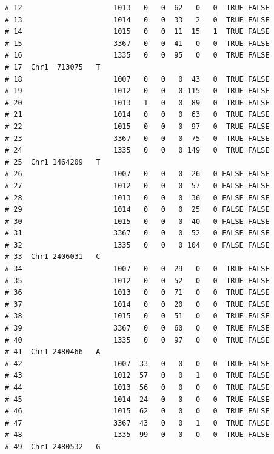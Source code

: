 \documentclass{article}\usepackage[]{graphicx}\usepackage[]{color}
\makeatletter
\newenvironment{kframe}{%
 \def\at@end@of@kframe{}%
 \ifinner\ifhmode%
  \def\at@end@of@kframe{\end{minipage}}%
  \begin{minipage}{\columnwidth}%
 \fi\fi%
 \def\FrameCommand##1{\hskip\@totalleftmargin \hskip-\fboxsep
 \colorbox{shadecolor}{##1}\hskip-\fboxsep
     \hskip-\linewidth \hskip-\@totalleftmargin \hskip\columnwidth}%
 \MakeFramed {\advance\hsize-\width
   \@totalleftmargin\z@ \linewidth\hsize
   \@setminipage}}%
 {\par\unskip\endMakeFramed%
 \at@end@of@kframe}
\newenvironment{knitrout}{}{} %
\makeatother
\begin{document}
\begin{knitrout}
\begin{kframe}
\begin{verbatim}
# 12                     1013   0   0  62   0   0  TRUE FALSE        
# 13                     1014   0   0  33   2   0  TRUE FALSE        
# 14                     1015   0   0  11  15   1  TRUE FALSE        
# 15                     3367   0   0  41   0   0  TRUE FALSE        
# 16                     1335   0   0  95   0   0  TRUE FALSE        
# 17  Chr1  713075   T                                               
# 18                     1007   0   0   0  43   0  TRUE FALSE        
# 19                     1012   0   0   0 115   0  TRUE FALSE        
# 20                     1013   1   0   0  89   0  TRUE FALSE        
# 21                     1014   0   0   0  63   0  TRUE FALSE        
# 22                     1015   0   0   0  97   0  TRUE FALSE        
# 23                     3367   0   0   0  75   0  TRUE FALSE        
# 24                     1335   0   0   0 149   0  TRUE FALSE        
# 25  Chr1 1464209   T                                               
# 26                     1007   0   0   0  26   0 FALSE FALSE        
# 27                     1012   0   0   0  57   0 FALSE FALSE        
# 28                     1013   0   0   0  36   0 FALSE FALSE        
# 29                     1014   0   0   0  25   0 FALSE FALSE        
# 30                     1015   0   0   0  40   0 FALSE FALSE        
# 31                     3367   0   0   0  52   0 FALSE FALSE        
# 32                     1335   0   0   0 104   0 FALSE FALSE        
# 33  Chr1 2406031   C                                               
# 34                     1007   0   0  29   0   0  TRUE FALSE        
# 35                     1012   0   0  52   0   0  TRUE FALSE        
# 36                     1013   0   0  71   0   0  TRUE FALSE        
# 37                     1014   0   0  20   0   0  TRUE FALSE        
# 38                     1015   0   0  51   0   0  TRUE FALSE        
# 39                     3367   0   0  60   0   0  TRUE FALSE        
# 40                     1335   0   0  97   0   0  TRUE FALSE        
# 41  Chr1 2480466   A                                               
# 42                     1007  33   0   0   0   0  TRUE FALSE        
# 43                     1012  57   0   0   1   0  TRUE FALSE        
# 44                     1013  56   0   0   0   0  TRUE FALSE        
# 45                     1014  24   0   0   0   0  TRUE FALSE        
# 46                     1015  62   0   0   0   0  TRUE FALSE        
# 47                     3367  43   0   0   1   0  TRUE FALSE        
# 48                     1335  99   0   0   0   0  TRUE FALSE        
# 49  Chr1 2480532   G                                               

\end{verbatim}
\end{kframe}
\end{knitrout}
\end{document}

